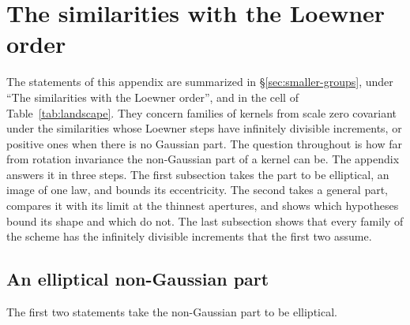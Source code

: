 
\section{The similarities with the Loewner order}\label{app:similarity}

The statements of this appendix are summarized in \S\ref{sec:smaller-groups}, under ``The similarities
with the Loewner order'', and in the cell of Table~\ref{tab:landscape}. They concern families of
kernels from scale zero covariant under the similarities whose Loewner steps have infinitely
divisible increments, or positive ones when there is no Gaussian part. The question throughout is
how far from rotation invariance the non-Gaussian part of a kernel can be. The appendix answers it in
three steps. The first subsection takes the part to be elliptical, an image of one law, and bounds its
eccentricity. The second takes a general part, compares it with its limit at the thinnest apertures,
and shows which hypotheses bound its shape and which do not. The last subsection shows that every
family of the scheme has the infinitely divisible increments that the first two assume.

\subsection{An elliptical non-Gaussian part}

The first two statements take the non-Gaussian part to be elliptical.

